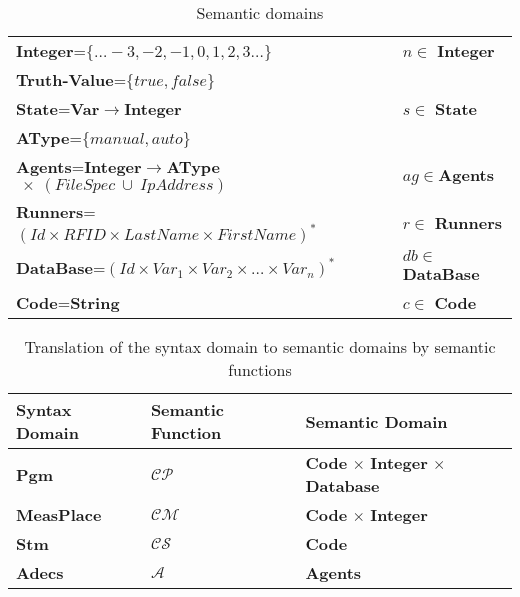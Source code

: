 \documentclass[preprint, prX]{revtex4}
\begin{document}
\begin{table}[htb]        \caption{Semantic domains}
\label{tab:Y}
\vspace{-5mm}
\begin{center}
\begin{tabular}{ | l  l | }
\hline
  \textbf{Integer}=$\{\ldots -3,-2,-1,0,1,2,3 \ldots\}$ & $n \in$ \textbf{Integer} \\
  \textbf{Truth-Value}=$\{true,false\}$ &  \\
  \textbf{State}=\textbf{Var}$\rightarrow$\textbf{Integer} & $s \in$ \textbf{State} \\
  \textbf{AType}=$\{manual,auto\}$ &  \\
  \textbf{Agents}=\textbf{Integer}$\rightarrow$\textbf{AType}$\ \times\ (FileSpec\ \cup\ IpAddress)$ & $ag \in$\textbf{Agents} \\
  \textbf{Runners}=$(Id \times RFID \times LastName \times FirstName)^{*}$ & $r \in $ \textbf{Runners}\\
  \textbf{DataBase}=$(Id \times Var_{1} \times Var_{2} \times \ldots \times Var_{n})^{*}$ & $db \in $ \textbf{DataBase}\\
  \textbf{Code}=\textbf{String} & $c \in $ \textbf{Code} \\
\hline
\end{tabular}
\end{center}
\vspace{-5mm}
\end{table}

\begin{table}[htb]        \caption{Translation of the syntax domain to semantic domains by semantic functions}
\label{tab:Z}
\vspace{-5mm}
\begin{center}
\begin{tabular}{ | l  l  l | }
\hline
 Syntax Domain & Semantic Function & Semantic Domain \\
\hline
 \textbf{Pgm} & $\mathcal{CP}$ & \textbf{Code} $\times$ \textbf{Integer} $\times$ \textbf{Database} \\
 \textbf{MeasPlace} & $\mathcal{CM}$ & \textbf{Code} $\times$ \textbf{Integer} \\
 \textbf{Stm} & $\mathcal{CS}$ & \textbf{Code} \\
 \textbf{Adecs} & $\mathcal{A}$ & \textbf{Agents} \\
\hline
\end{tabular}
\end{center}
\vspace{-5mm}
\end{table}
\end{document}
